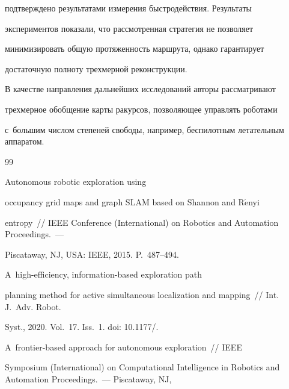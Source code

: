 подтверждено результатами измерения быстродействия. Результаты 

экспериментов показали, что рассмотренная стратегия не позволяет 

минимизировать общую протяженность маршрута, однако гарантирует 

достаточную полноту трехмерной реконструкции.

  

  В качестве направления дальнейших исследований авторы рассматривают 

трехмерное обобщение карты ракурсов, позволяющее управлять роботами 

с~большим числом степеней свободы, например, беспилотным летательным аппаратом.

  

{\small\frenchspacing

{%


\begin{thebibliography}{99}

  


   Autonomous robotic exploration using 

occupancy grid maps and graph SLAM based on Shannon and R$\acute{\mbox{e}}$nyi 

entropy~/\!\!/  IEEE  Conference (International) on Robotics and Automation Proceedings.~--- 

Piscataway, NJ, USA: IEEE, 2015. P.~487--494.




   A~high-efficiency, information-based exploration path 

planning method for active simultaneous localization and mapping~/\!\!/ Int. J.~Adv. Robot. 

Syst., 2020. Vol.~17. Iss.~1. doi: 10.1177\!/.




   A~frontier-based approach for autonomous exploration~/\!/\! IEEE  

Symposium (International) on Computational Intelligence in Robotics and Automation Proceedings.~--- Piscataway, NJ, 


\end{thebibliography}}}

